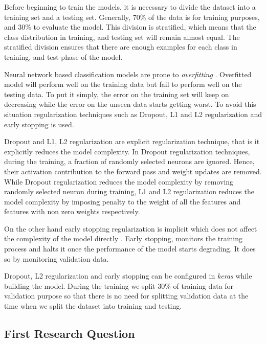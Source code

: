 Before beginning to train the models, it is necessary to divide the dataset into a training set and a testing set. Generally, 70\% of the data is for training purposes, and 30\% to evaluate the model. This division is stratified, which means that the class distribution in training, and testing set will remain almost equal. The stratified division ensures that there are enough examples for each class in training, and test phase of the model. 

Neural network based classification models are prone to \textit{overfitting} \cite{Prechelt1998}. Overfitted model will perform well on the training data but fail to perform well on the testing data. To put it simply, the error on the training set will keep on decreasing while the error on the unseen data starts getting worst. To avoid this situation regularization techniques such as Dropout, L1 and L2 regularization and early stopping is used.

Dropout and L1, L2 regularization are explicit regularization technique, that is it explicitly reduces the model complexity. In Dropout regularization techniques, during the training, a fraction of randomly selected neurons are ignored. Hence, their activation contribution to the forward pass and weight updates are removed. While Dropout regularization reduces the model complexity by removing randomly selected neuron during training, L1 and L2 regularization reduces the model complexity by imposing penalty to the weight of all the features and features with non zero weights respectively.      

On the other hand early stopping regularization is implicit which does not affect the complexity of the model directly \cite{zhang2016understanding}. Early stopping, monitors the training process and halts it once the performance of the model starts degrading. It does so by monitoring validation data. 


Dropout, L2 regularization and early stopping can be configured in \textit{keras} while building the model. During the training we split 30\% of training data for validation purpose so that there is no need for splitting validation data at the time when we split the dataset into training and testing.

\subsection{First Research Question} \label{impQuestion1}

